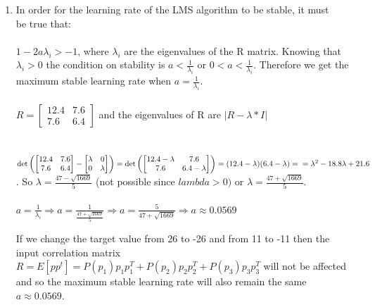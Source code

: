 \documentclass{article}
\begin{document}
\begin{enumerate}[label=\Alph*]
    
  \item In order for the learning rate of the LMS algorithm to be stable, it must \\be true that: \\ \\${1-2a\lambda_i > -1}$, where ${\lambda_i}$ are the eigenvalues of the R matrix. Knowing that ${\lambda_i > 0}$ the condition on stability is
  ${a < \frac{1}{\lambda_i}}$ or ${0 < a < \frac{1}{\lambda_i}}$. Therefore we get the maximum stable learning rate when ${a = \frac{1}{\lambda_i}}$. 
  \\ \\ $R = \begin{bmatrix}
    12.4 & 7.6 \\
    7.6 & 6.4
  \end{bmatrix} $
  and the eigenvalues of R are ${|R - \lambda*I|}$ \\ \\
  \\$\det \left ( \begin{bmatrix}
    12.4 & 7.6 \\
    7.6 & 6.4
  \end{bmatrix} 
  -\begin{bmatrix}
    \lambda & 0 \\
    0 & \lambda
  \end{bmatrix} \right )  = 
  \det \left (\begin{bmatrix}
    12.4-\lambda & 7.6 \\
    7.6 & 6.4-\lambda
\end{bmatrix} \right ) = (12.4-\lambda)(6.4-\lambda) = \\ \\ \\=\lambda^2 - 18.8\lambda + 21.6$
. So ${\lambda = \frac{47 - \sqrt{1669} }{5}}$ (not possible since ${lambda > 0})$ or ${\lambda = \frac{47 + \sqrt{1669} }{5}}$.
\\ \\ ${a = \frac{1}{\lambda_i} \Rightarrow a= \frac{1}{\frac{47 + \sqrt{1669} }{5}}} \Rightarrow a = \frac{5}{47+\sqrt{1669}} \Rightarrow a \approx 0.0569 $

If we change the target value from 26 to -26 and from 11 to -11 then the input correlation matrix 
$R = E[pp^t] = P(p_1)p_1p_1^T + P(p_2)p_2p_2^T + P(p_3)p_3p_3^T$ will not be affected and so the maximum stable learning rate will also remain the same ${a \approx 0.0569}$.


\end{enumerate}
\end{document}
